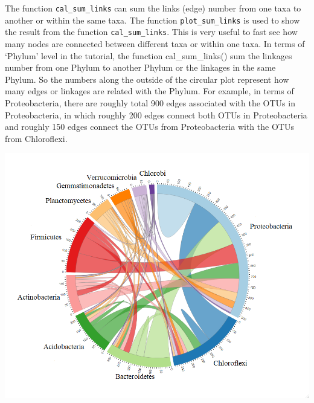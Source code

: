 \documentclass[
]{book}
\newenvironment{Shaded}{\begin{snugshade}}{\end{snugshade}}
\newcommand{\AttributeTok}[1]{\textcolor[rgb]{0.77,0.63,0.00}{#1}}
\newcommand{\CommentTok}[1]{\textcolor[rgb]{0.56,0.35,0.01}{\textit{#1}}}
\newcommand{\ConstantTok}[1]{\textcolor[rgb]{0.00,0.00,0.00}{#1}}
\newcommand{\DecValTok}[1]{\textcolor[rgb]{0.00,0.00,0.81}{#1}}
\newcommand{\FunctionTok}[1]{\textcolor[rgb]{0.00,0.00,0.00}{#1}}
\newcommand{\NormalTok}[1]{#1}
\newcommand{\SpecialCharTok}[1]{\textcolor[rgb]{0.00,0.00,0.00}{#1}}
\newcommand{\StringTok}[1]{\textcolor[rgb]{0.31,0.60,0.02}{#1}}
\begin{document}
The function \texttt{cal\_sum\_links} can sum the links (edge) number from one taxa to another or within the same taxa.
The function \texttt{plot\_sum\_links} is used to show the result from the function \texttt{cal\_sum\_links}.
This is very useful to fast see how many nodes are connected between different taxa or within one taxa.
In terms of `Phylum' level in the tutorial, the function cal\_sum\_links() sum the linkages number from one Phylum to another Phylum or the linkages in the same Phylum.
So the numbers along the outside of the circular plot represent how many edges or linkages are related with the Phylum.
For example, in terms of Proteobacteria, there are roughly total 900 edges associated with the OTUs in Proteobacteria,
in which roughly 200 edges connect both OTUs in Proteobacteria and roughly 150 edges connect the OTUs from Proteobacteria with the OTUs from Chloroflexi.

\begin{Shaded}
\end{Shaded}

\begin{center}\includegraphics[width=700px]{Images/trans_network_sum_links} \end{center}
\end{document}
